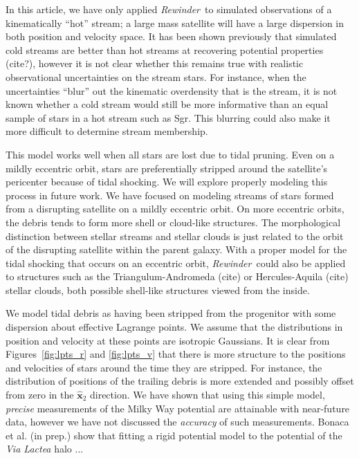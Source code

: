 \documentclass[letterpaper,12pt,preprint]{aastex}
\newcommand{\project}[1]{\textsl{#1}}
\newcommand{\bs}{\boldsymbol}
\newcommand{\rewinder}{\emph{Rewinder}}
\begin{document}
In this article, we have only applied \rewinder\, to simulated observations of a kinematically ``hot'' stream; a large mass satellite will have a large dispersion in both position and velocity space. It has been shown previously that simulated cold streams are better than hot streams at recovering potential properties (cite?), however it is not clear whether this remains true with realistic observational uncertainties on the stream stars. For instance, when the uncertainties ``blur'' out the kinematic overdensity that is the stream, it is not known whether a cold stream would still be more informative than an equal sample of stars in a hot stream such as Sgr. This blurring could also make it more difficult to determine stream membership.

This model works well when all stars are lost due to tidal pruning. Even on a mildly eccentric orbit, stars are preferentially stripped around the satellite's pericenter because of tidal shocking. We will explore properly modeling this process in future work. We have focused on modeling streams of stars formed from a disrupting satellite on a mildly eccentric orbit. On more eccentric orbits, the debris tends to form more shell or cloud-like structures. The morphological distinction between stellar streams and stellar clouds is just related to the orbit of the disrupting satellite within the parent galaxy. With a proper model for the tidal shocking that occurs on an eccentric orbit, \rewinder\, could also be applied to structures such as the Triangulum-Andromeda (cite) or Hercules-Aquila (cite) stellar clouds, both possible shell-like structures viewed from the inside. 

We model tidal debris as having been stripped from the progenitor with some dispersion about effective Lagrange points. We assume that the distributions in position and velocity at these points are isotropic Gaussians. It is clear from Figures~\ref{fig:lpts_r} and \ref{fig:lpts_v} that there is more structure to the positions and velocities of stars around the time they are stripped. For instance, the distribution of positions of the trailing debris is more extended and possibly offset from zero in the $\hat{\bs{x}}_2$ direction. We have shown that using this simple model, \emph{precise} measurements of the Milky Way potential are attainable with near-future data, however we have not discussed the \emph{accuracy} of such measurements. Bonaca et al. (in prep.) show that fitting a rigid potential model to the potential of the \project{Via Lactea} halo ... %
  
\end{document}
